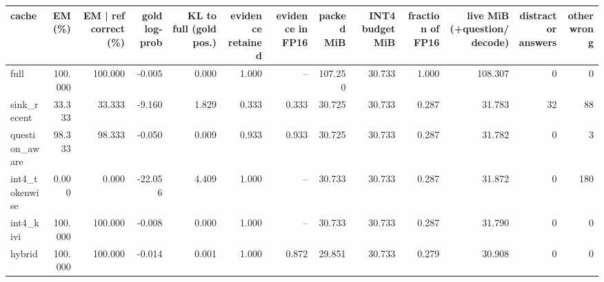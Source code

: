 \begin{tabular}{lrrrrrrrrrrrr}
\toprule
cache & EM (\%) & EM | ref correct (\%) & gold log-prob & KL to full (gold pos.) & evidence retained & evidence in FP16 & packed MiB & INT4 budget MiB & fraction of FP16 & live MiB (+question/decode) & distractor answers & other wrong \\
\midrule
full & 100.000 & 100.000 & -0.005 & 0.000 & 1.000 & -- & 107.250 & 30.733 & 1.000 & 108.307 & 0 & 0 \\
sink\_recent & 33.333 & 33.333 & -9.160 & 1.829 & 0.333 & 0.333 & 30.725 & 30.733 & 0.287 & 31.783 & 32 & 88 \\
question\_aware & 98.333 & 98.333 & -0.050 & 0.009 & 0.933 & 0.933 & 30.725 & 30.733 & 0.287 & 31.782 & 0 & 3 \\
int4\_tokenwise & 0.000 & 0.000 & -22.056 & 4.409 & 1.000 & -- & 30.733 & 30.733 & 0.287 & 31.872 & 0 & 180 \\
int4\_kivi & 100.000 & 100.000 & -0.008 & 0.000 & 1.000 & -- & 30.733 & 30.733 & 0.287 & 31.790 & 0 & 0 \\
hybrid & 100.000 & 100.000 & -0.014 & 0.001 & 1.000 & 0.872 & 29.851 & 30.733 & 0.279 & 30.908 & 0 & 0 \\
\bottomrule
\end{tabular}
